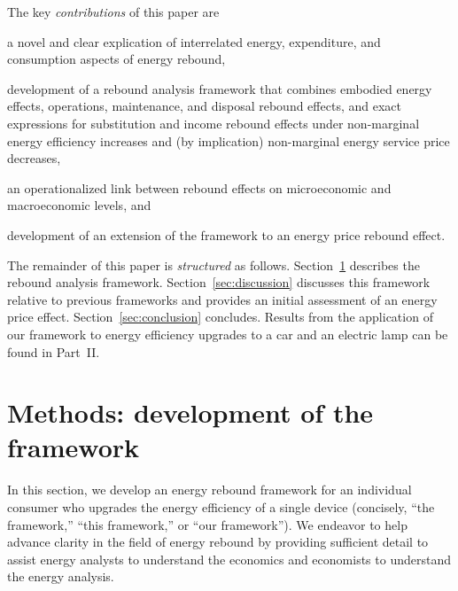 \documentclass[12pt]{article}\usepackage[]{graphicx}\usepackage[]{xcolor}
\begin{document}
The key \emph{contributions} of this paper are 
%
\begin{enumerate*}[label={(\roman*)}]
	
	\item a novel and clear explication of interrelated
	      energy, expenditure, and consumption
	      aspects of energy rebound,
	
  \item development of a
        rebound analysis framework that combines 
        embodied energy effects,
        operations, maintenance, and disposal
        rebound effects,
        and exact expressions for substitution 
        and income rebound effects
	      under non-marginal energy efficiency increases and 
        (by implication) non-marginal energy service price
        decreases,
        
  \item an operationalized link between 
        rebound effects on 
        microeconomic and macroeconomic levels, and 
        
  \item development of an extension of the framework to 
        an energy price rebound effect.
        
\end{enumerate*}

The remainder of this paper is \emph{structured} as follows.
Section~\ref{sec:framework} describes the rebound analysis framework.
Section~\ref{sec:discussion} discusses this framework relative to previous frameworks and 
provides an initial assessment 
of an energy price effect.  
Section~\ref{sec:conclusion} concludes.
Results from the application of our framework
to energy efficiency upgrades to a car and an electric lamp
can be found in Part~II.


\section{Methods: development of the framework}
\label{sec:framework}

In this section, we develop 
an energy rebound framework
for an individual consumer who upgrades the energy efficiency 
of a single device
(concisely, ``the framework,'' ``this framework,'' or ``our framework'').
We endeavor to help advance clarity in the field of energy rebound by 
providing sufficient detail to assist
energy analysts to understand the economics and
economists to understand the energy analysis.
\end{document}

